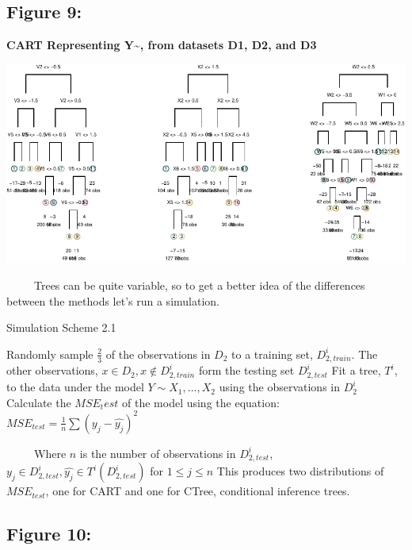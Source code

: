 \documentclass[12pt,twoside]{reedthesis}
\begin{document}
  \subsection{Figure 9:}\label{figure-9}
  
  \textbf{CART Representing Y\textasciitilde{}, from datasets D1, D2, and
  D3}
  
  \begin{center}\includegraphics{Thesis_files/figure-latex/fig9-1} \end{center}
  
  ~~~~~Trees can be quite variable, so to get a better idea of the
  differences between the methods let's run a simulation.
  
  \begin{algorithm}
  \caption{Simulation Scheme 2.1}
  \label{sim2.1}
  \begin{algorithmic}[1]
  \State Randomly sample $\frac 2 3$  of the observations in  $D_2$  to a training set,  $D_{2, train}^i$. The other observations,  $x \in D_2, x \notin D_{2, train}^i$ form the testing set $D_{2, test}^i$
  \State Fit a tree, $T^i$, to the data under the model $Y \sim X_1,...,X_2$ using the observations in      $D_{2}^i$
  \State Calculate the $MSE_test$ of the model using the equation:
      $MSE_{test} = \frac 1 n \sum (y_j - \hat{y_j})^2$
  \EndFor
  \end{algorithmic}
  \end{algorithm}
  
  ~~~~~Where \(n\) is the number of observations in \(D_{2, test}^i\),
  \(y_j \in D_{2, test}^i, \hat{y_j} \in T^i(D_{2, test}^i)\) for
  \(1 \leq j \leq n\) This produces two distributions of \(MSE_{test}\),
  one for CART and one for CTree, conditional inference trees.
  
  \subsection{Figure 10:}\label{figure-10}
  
\end{document}

